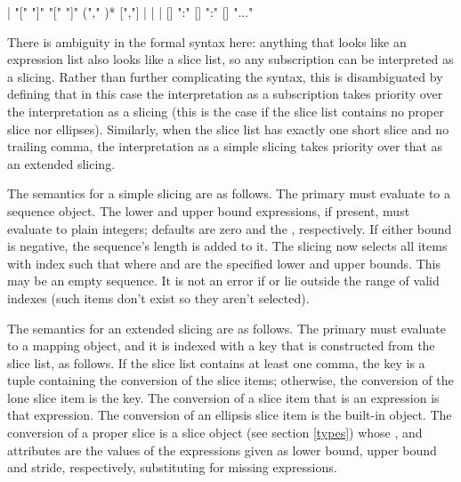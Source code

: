 \begin{productionlist}
             { | }
             { "["  "]"}
             { "["  "]" }
             { ("," )* [","]}
             { |  | }
             { | }
             {[] ":" []}
             { ":" []}
             {}
             {}
             {}
             {"..."}
\end{productionlist}

There is ambiguity in the formal syntax here: anything that looks like
an expression list also looks like a slice list, so any subscription
can be interpreted as a slicing.  Rather than further complicating the
syntax, this is disambiguated by defining that in this case the
interpretation as a subscription takes priority over the
interpretation as a slicing (this is the case if the slice list
contains no proper slice nor ellipses).  Similarly, when the slice
list has exactly one short slice and no trailing comma, the
interpretation as a simple slicing takes priority over that as an
extended slicing.

The semantics for a simple slicing are as follows.  The primary must
evaluate to a sequence object.  The lower and upper bound expressions,
if present, must evaluate to plain integers; defaults are zero and the
, respectively.  If either bound is negative, the
sequence's length is added to it.  The slicing now selects all items
with index  such that
 where 
and  are the specified lower and upper bounds.  This may be an
empty sequence.  It is not an error if  or  lie outside the
range of valid indexes (such items don't exist so they aren't
selected).

The semantics for an extended slicing are as follows.  The primary
must evaluate to a mapping object, and it is indexed with a key that
is constructed from the slice list, as follows.  If the slice list
contains at least one comma, the key is a tuple containing the
conversion of the slice items; otherwise, the conversion of the lone
slice item is the key.  The conversion of a slice item that is an
expression is that expression.  The conversion of an ellipsis slice
item is the built-in  object.  The conversion of a
proper slice is a slice object (see section \ref{types}) whose
,  and  attributes are the
values of the expressions given as lower bound, upper bound and
stride, respectively, substituting  for missing
expressions.


